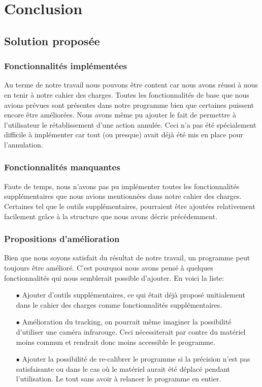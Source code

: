 \documentclass[11pt,a4paper,oldfontcommands]{memoir}
\begin{document}

\chapter{Conclusion}

\section{Solution proposée}

\subsection{Fonctionnalités implémentées}

Au terme de notre travail nous pouvons être content car nous avons réussi à nous en tenir à notre cahier des charges. Toutes les fonctionnalités de base que nous avions prévues sont présentes dans notre programme bien que certaines puissent encore être améliorées. Nous avons même pu ajouter le fait de permettre à l'utilisateur le rétablissement d'une action annulée. Ceci n'a pas été spécialement difficile à implémenter car tout (ou presque) avait déjà été mis en place pour l'annulation. 

\subsection{Fonctionnalités manquantes}

Faute de temps, nous n'avons pas pu implémenter toutes les fonctionnalités supplémentaires que nous avions mentionnées dans notre cahier des charges. Certaines tel que le outils supplémentaires, pourraient être ajoutées relativement facilement grâce à la structure que nous avons décris précédemment.

\subsection{Propositions d'amélioration}

Bien que nous soyons satisfait du résultat de notre travail, un programme peut toujours être amélioré. C'est pourquoi nous avons pensé à quelques fonctionnalités qui nous semblerait possible d'ajouter. En voici la liste:
\begin{itemize}
\item[$\bullet$] Ajouter d'outils supplémentaires, ce qui était déjà proposé unitialement dans le cahier des charges comme fonctionnalités supplémentaires.
\item[$\bullet$] Amélioration du tracking, on pourrait même imaginer la possibilité d'utiliser une caméra infrarouge. Ceci nécessiterait par contre du matériel moins commun et rendrait donc moins accessible le programme.
\item[$\bullet$] Ajouter la possibilité de re-calibrer le programme si la précision n'est pas satisfaisante ou dans le cas où le matériel aurait été déplacé pendant l'utilisation. Le tout sans avoir à relancer le programme en entier.
\end{itemize}
\end{document}
